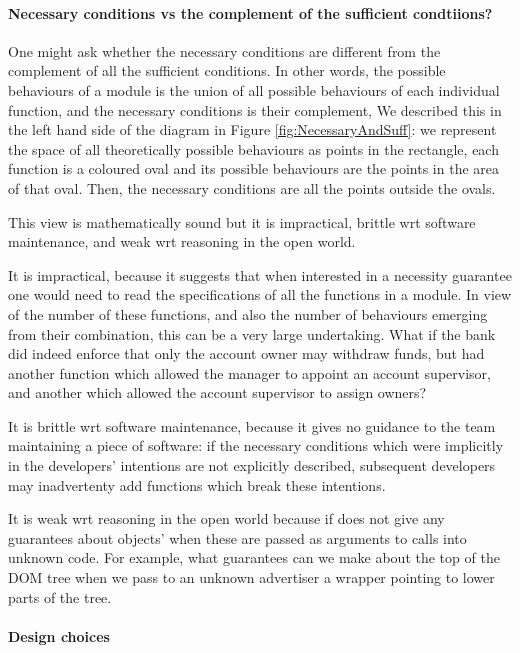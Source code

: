 \paragraph{Necessary conditions vs the complement of the sufficient condtiions?}
One might ask whether the necessary conditions are different from the complement of all the sufficient conditions.
In other words, the possible behaviours of a module is the union of all possible behaviours of 
each individual function, and the necessary conditions is their complement,
We described this in the left hand side of the diagram in Figure \ref{fig:NecessaryAndSuff}: we 
represent the space of all theoretically possible behaviours as points in the rectangle, 
each function is a coloured oval and its possible behaviours are the points in the area of that oval.   
Then, the necessary conditions are all the points  outside the ovals.  

This view is mathematically sound but it is  impractical,  brittle wrt software maintenance, and weak wrt reasoning in the open world.



It is impractical, because it suggests that when interested in a necessity guarantee 
one would need to read the specifications of all the functions  in a module.
In view of the number of these functions, and also 
  the number of   behaviours emerging from their combination, this can be a  very large undertaking.
 What if the bank did indeed enforce that only the account
owner may withdraw funds, but had another function which allowed the manager
to appoint an account supervisor, and another which allowed the account supervisor to
assign owners?

It is brittle wrt software maintenance, because it
 gives no guidance to the team maintaining a piece of software: if the 
necessary conditions which were implicitly in the developers' intentions are not explicitly 
described, subsequent developers may inadvertenty add functions which break these intentions.

It is weak wrt reasoning in the open world because if does not give any guarantees about objects' when
these are passed as arguments to calls into unknown code. For example, what  guarantees  
can we make about the top of the DOM tree when we pass  to an unknown advertiser a wrapper 
pointing to lower parts of the tree.

\paragraph{Design choices}
